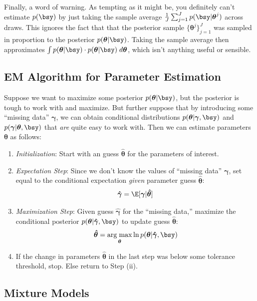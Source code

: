 \documentclass[12pt]{article}
\theoremstyle{plain}
\theoremstyle{definition}
\theoremstyle{remark}
\newcommand{\bstheta}{\boldsymbol{\theta}}
\newcommand{\bsgamma}{\boldsymbol{\gamma}}
\newcommand{\bshatgamma}{\boldsymbol{\hat{\gamma}}}
\newcommand{\bshattheta}{\boldsymbol{\hat{\theta}}}
\DeclareMathOperator*{\argmax}{arg\;max}
\begin{document}
Finally, a word of warning. As tempting as it might be, you definitely
can't estimate $p(\bsy)$ by just taking the sample average
$\frac{1}{J}\sum_{j=1}^J p(\bsy|\bstheta^j)$ across draws. This ignores
the fact that that the posterior sample $\{\bstheta^j\}_{j=1}^J$ was
sampled in proportion to the posterior $p(\bstheta|\bsy)$.  Taking the
sample average then approximates $\int
p(\bstheta|\bsy)\cdot p(\bstheta|\bsy)\;d\bstheta$, which isn't anything
useful or sensible.


\clearpage
\subsection{EM Algorithm for Parameter Estimation}

Suppose we want to maximize some posterior $p(\bstheta|\bsy)$,
but the posterior is tough to work with and maximize.
But further suppose that by introducing some ``missing data''
$\bsgamma$, we can obtain conditional distributions
$p(\bstheta|\bsgamma,\bsy)$ and $p(\bsgamma|\bstheta,\bsy)$
that \emph{are} quite easy to work with.
Then we can estimate parameters $\bstheta$ as follows:
\begin{enumerate}
  \item \emph{Initialization}: Start with an guess $\bshattheta$ for the
    parameters of interest.
  \item \emph{Expectation Step}:
    Since we don't know the values of ``missing data'' $\bsgamma$, set
    equal to the conditional expectation \emph{given} parameter
    guess $\bshattheta$:
    \begin{align*}
      \bshatgamma=\E[\bsgamma|\bshattheta]
    \end{align*}
  \item
    \emph{Maximization Step}:
    Given guess $\bshatgamma$ for the ``missing data,'' maximize the
    conditional posterior $p(\bstheta|\bshatgamma,\bsy)$ to update
    guess $\bshattheta$:
    \begin{align*}
      \bshattheta
      = \argmax_{\bstheta} \ln p(\bstheta|\bshatgamma,\bsy)
    \end{align*}

  \item
    If the change in parameters $\bshattheta$ in the last step was below
    some tolerance threshold, stop. Else return to Step (ii).
\end{enumerate}



\clearpage
\subsection{Mixture Models}
\end{document}
